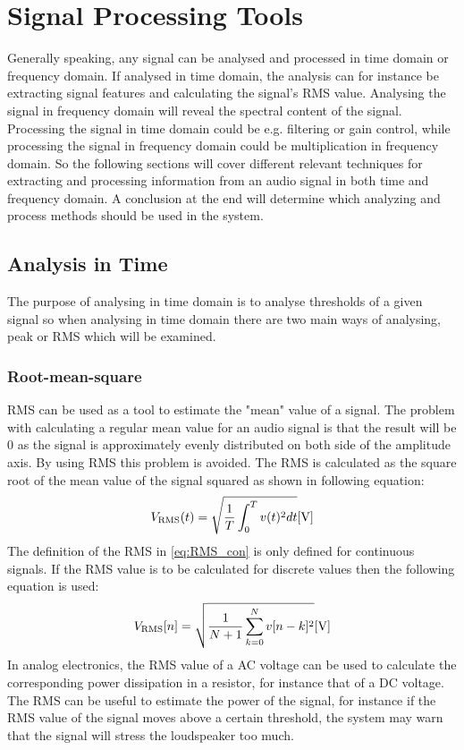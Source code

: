 \chapter{Signal Processing Tools}
Generally speaking, any signal can be analysed and processed in time domain or frequency domain. If analysed in time domain, the analysis can for instance be extracting signal features and calculating the signal's RMS value. Analysing the signal in frequency domain will reveal the spectral content of the signal. Processing the signal in time domain could be e.g. filtering or gain control, while processing the signal in frequency domain could be multiplication in frequency domain. So the following sections will cover different relevant techniques for extracting and processing information from an audio signal in both time and frequency domain. A conclusion at the end will determine which analyzing and process methods should be used in the system.

\section{Analysis in Time} \label{sec:SignalTime}
The purpose of analysing in time domain is to analyse thresholds of a given signal so when analysing in time domain there are two main ways of analysing, peak or RMS which will be examined.
\subsection*{Root-mean-square}
RMS can be used as a tool to estimate the "mean" value of a signal. The problem with calculating a regular mean value for an audio signal is that the result will be 0 as the signal is approximately evenly distributed on both side of the amplitude axis. By using RMS this problem is avoided. The RMS is calculated as the square root of the mean value of the signal squared as shown in following equation:
\begin{equation}\label{eq:RMS_con}
V_{\text{RMS}}(t) = \sqrt{\frac{1}{T}\int_0^T v(t)^2 dt} \enhed{V}
\end{equation}
The definition of the RMS in \autoref{eq:RMS_con} is only defined for continuous signals. If the RMS value is to be calculated for discrete values then the following equation is used:
\begin{equation}
V_{\text{RMS}}[n] = \sqrt{\frac{1}{N+1}\sum_{k=0}^{N} v[n-k]^2} \enhed{V}
\end{equation}
In analog electronics, the RMS value of a AC voltage can be used to calculate the corresponding power dissipation in a resistor, for instance that of a DC voltage. The RMS can be useful to estimate the power of the signal, for instance if the RMS value of the signal moves above a certain threshold, the system may warn that the signal will stress the loudspeaker too much.

